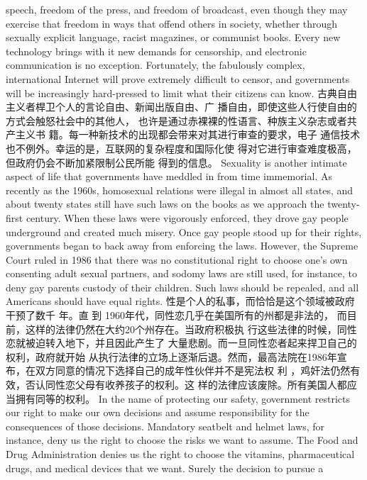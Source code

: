 \begin{paracol}{2}
speech, freedom of the press, and freedom of broadcast, even
though they may exercise that freedom in ways that offend others in society, whether through sexually explicit language, racist
magazines, or communist books. Every new technology brings
with it new demands for censorship, and electronic communication is no exception. Fortunately, the fabulously complex, international Internet will prove extremely difficult to censor, and
governments will be increasingly hard-pressed to limit what
their citizens can know.
\switchcolumn
古典自由主义者桿卫个人的言论自由、新闻出版自由、广
播自由，即使这些人行使自由的方式会触怒社会中的其他人，
也许是通过赤裸裸的性语言、种族主义杂志或者共产主义书
籍。每一种新技术的出现都会带来对其进行审查的要求，电子
通信技术也不例外。幸运的是，互联网的复杂程度和国际化使
得对它进行审查难度极高，但政府仍会不断加紧限制公民所能
得到的信息。
\switchcolumn*
Sexuality is another intimate aspect of life that governments
have meddled in from time immemorial. As recently as the
1960s, homosexual relations were illegal in almost all states,
and about twenty states still have such laws on the books as we
approach the twenty-first century. When these laws were vigorously enforced, they drove gay people underground and created
much misery. Once gay people stood up for their rights, governments began to back away from enforcing the laws. However, the Supreme Court ruled in 1986 that there was no
constitutional right to choose one's own consenting adult sexual partners, and sodomy laws are still used, for instance, to
deny gay parents custody of their children. Such laws should be
repealed, and all Americans should have equal rights.
\switchcolumn
性是个人的私事，而恰恰是这个领域被政府干预了数千
年。直 到 1960年代，同性恋几乎在美国所有的州都是非法的，
而目前，这样的法律仍然在大约20个州存在。当政府积极执
行这些法律的时候，同性恋就被迫转入地下，并且因此产生了
大量悲剧。而一旦同性恋者起来捍卫自己的权利，政府就开始
从执行法律的立场上逐渐后退。然而，最高法院在1986年宣
布，在双方同意的情况下选择自己的成年性伙伴并不是宪法权
利 ，鸡奸法仍然有效，否认同性恋父母有收养孩子的权利。这
样的法律应该废除。所有美国人都应当拥有同等的权利。
\switchcolumn*
In the name of protecting our safety, government restricts
our right to make our own decisions and assume responsibility
for the consequences of those decisions. Mandatory seatbelt and
helmet laws, for instance, deny us the right to choose the risks
we want to assume. The Food and Drug Administration denies
us the right to choose the vitamins, pharmaceutical drugs, and
medical devices that we want. Surely the decision to pursue a

\end{paracol}
